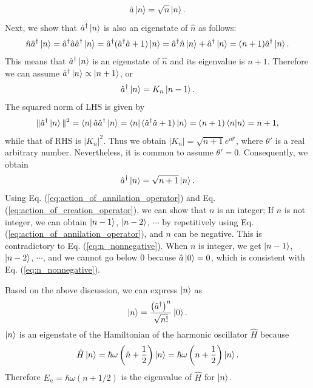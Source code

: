 \begin{equation}
  \hat a\ket n = \sqrt n \ket n.
  \label{eq:action_of_annilation_operator}
\end{equation}
Next, we show that $\hat a^\dagger\ket n$ is also an eigenstate of $\hat n$ as follows: 
\begin{equation}
  \hat n \hat a^\dagger \ket n = \hat a^\dagger \hat a \hat a^\dagger \ket n = \hat a^\dagger (\hat a^\dagger \hat a + 1)\ket n = \hat a^\dagger \hat n\ket n + \hat a^\dagger \ket n = (n + 1)\hat a^\dagger \ket n.
\end{equation}
This means that $\hat a^\dagger \ket n$ is an eigenstate of $\hat n$ and its eigenvalue is $n+1$. Therefore we can assume $\hat a^\dagger\ket n \propto \ket {n+1}$, or 
\begin{equation}
  \hat a^\dagger\ket n = K_n\ket{n-1}.
\end{equation}
The squared norm of LHS is given by
\begin{equation}
  \| \hat a^\dagger \ket n\|^2 = \bra n \hat a \hat a^\dagger \ket n = \bra n (\hat a^\dagger \hat a + 1) \ket n = (n+1)\braket{n|n} = n+1,
\end{equation}
while that of RHS is $|K_n|^2$. Thus we obtain $|K_n| = \sqrt {n+1} e^{i\theta'}$, where $\theta'$ is a real arbitrary number. Nevertheless, it is common to assume $\theta' = 0$. Consequently, we obtain
\begin{equation}
  \hat a^\dagger\ket n = \sqrt {n+1} \ket n.
  \label{eq:action_of_creation_operator}
\end{equation}
Using Eq. (\ref{eq:action_of_annilation_operator}) and Eq. (\ref{eq:action_of_creation_operator}), we can show that $n$ is an integer; If $n$ is not integer, we can obtain $\ket{n-1}$, $\ket{n-2}$, $\cdots$ by repetitively using Eq. (\ref{eq:action_of_annilation_operator}), and $n$ can be negative. This is contradictory to Eq. (\ref{eq:n_nonnegative}). When $n$ is integer, we get $\ket{n - 1}$, $\ket{n - 2}$, $\cdots$, and we cannot go below 0 because $\hat a \ket 0 = 0$, which is consistent with Eq. (\ref{eq:n_nonnegative}).

Based on the above discussion, we can express $\ket n$ as
\begin{equation}
  \ket n = \frac{\left(\hat a^\dagger\right)^n}{\sqrt{n!}}\ket 0.
  \label{eq:energy_eigenstate}
\end{equation}
$\ket n$ is an eigenstate of the Hamiltonian of the harmonic oscillator $\hat H$ because
\begin{equation}
  \hat H \ket n = \hbar \omega \left(\hat n + \frac 1 2 \right)\ket n =  \hbar \omega \left(n + \frac 1 2 \right)\ket n.
\end{equation}
Therefore $E_n = \hbar \omega (n + 1/2)$ is the eigenvalue of $\hat H$ for $\ket n$.

